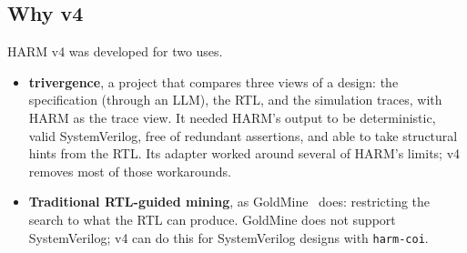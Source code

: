 \subsection{Why v4}
HARM v4 was developed for two uses.
\begin{itemize}
\item \textbf{trivergence}, a project that compares three views of a design: the specification (through an LLM), the RTL, and the simulation traces, with HARM as the trace view. It needed HARM's output to be deterministic, valid SystemVerilog, free of redundant assertions, and able to take structural hints from the RTL. Its adapter worked around several of HARM's limits; v4 removes most of those workarounds.
\item \textbf{Traditional RTL-guided mining}, as GoldMine~\cite{goldmine} does: restricting the search to what the RTL can produce. GoldMine does not support SystemVerilog; v4 can do this for SystemVerilog designs with \texttt{harm-coi}.
\end{itemize}

